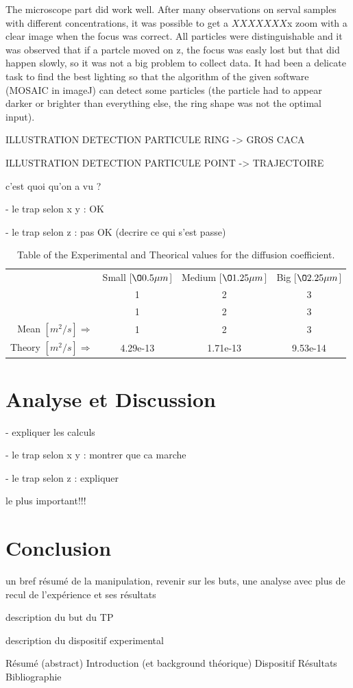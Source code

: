 \documentclass[a4paper,12pt,twoside]{article}	%
\begin{document}
The microscope part did work well. After many observations on serval samples with different concentrations, it was possible to get a $XXXXXXX $x zoom with a clear image when the focus was correct. All particles were distinguishable and it was observed that if a partcle moved on z, the focus was easly lost but that did happen slowly, so it was not a big problem to collect data. It had been a delicate task to find the best lighting so that the algorithm of the given software (MOSAIC in imageJ) can detect some particles (the particle had to appear darker or brighter than everything else, the ring shape was not the optimal input).

ILLUSTRATION DETECTION PARTICULE RING -> GROS CACA

ILLUSTRATION DETECTION PARTICULE POINT -> TRAJECTOIRE

c'est quoi qu'on a vu ?

- le trap selon x y : OK

- le trap selon z : pas OK (decrire ce qui s'est passe)

\begin{table}
	\begin{tabular}{ r|c|c|c| }
		\multicolumn{1}{r}{} &  \multicolumn{1}{c}{Small [$\O 0.5\mu m$]} & 			\multicolumn{1}{c}{Medium [$\O 1.25\mu m$]} & 			\multicolumn{1}{c}{Big [$\O 2.25\mu m$]}\\
		\cline{2-4}						& 1 & 2 & 3 \\
		  								& 1 & 2 & 3 \\

		\cline{2-4} Mean $[m^2/s] \Rightarrow$ & 1 & 2 & 3\\
		\cline{2-4} Theory $[m^2/s] \Rightarrow$ & 4.29e-13 & 1.71e-13 & 9.53e-14\\
		\cline{2-4}
	\end{tabular}
	\caption{Table of the Experimental and Theorical values for the diffusion coefficient.}
	\label{tab:diffusion}
\end{table}

\section{Analyse et Discussion}

- expliquer les calculs

- le trap selon x y : montrer que ca marche

- le trap selon z : expliquer

le plus important!!!

\section{Conclusion}

un bref résumé de la manipulation, revenir sur les buts, une analyse avec plus de recul de l'expérience et ses résultats

description du but du TP

description du dispositif experimental

Résumé (abstract)
Introduction (et background théorique)
Dispositif
Résultats
Bibliographie
\end{document}
